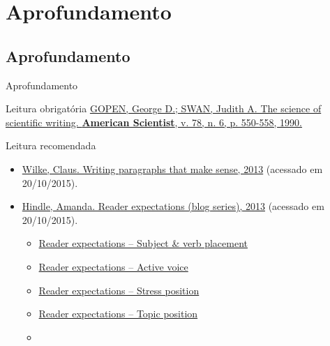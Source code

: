 \documentclass{beamer}
\begin{document}
\section{Aprofundamento}

\subsection{Aprofundamento}

\begin{frame}{Aprofundamento}
  \begin{block}{Leitura obrigatória}
    \footnotesize
    \href{https://www.georgegopen.com/uploads/1/0/9/0/109073507/gopen___swan_sci_of_sci_writing_am_sci_1990_.pdf}
    {GOPEN, George D.; SWAN, Judith A. The science of scientific writing. {\bf American Scientist}, v. 78, n. 6, p. 550-558, 1990.}
  \end{block}
  \begin{block}{Leitura recomendada}
    \begin{itemize}
      \tiny
    \item
      \href{http://serialmentor.com/blog/2013/9/26/writing-paragraphs-that-make-sensethe-topic-and-the-stress-position}
      {Wilke, Claus. Writing paragraphs that make sense, 2013} {\tiny (acessado em 20/10/2015)}.
    \item
      \href{https://web.archive.org/web/20150512085221/http://www.edanzediting.com/blog/tag/reader_expectations}
      {Hindle, Amanda. Reader expectations (blog series), 2013} {\tiny (acessado em 20/10/2015)}.
      \begin{itemize}
        \tiny
      \item
        \href{https://web.archive.org/web/20150512001938/http://www.edanzediting.com/blog/reader_expectations_subject_verb_placement}
        {Reader expectations -- Subject \& verb placement}
      \item
        \href{https://web.archive.org/web/20150321052033/http://www.edanzediting.com/blog/reader_expectations_active_voice}
        {Reader expectations -- Active voice}
      \item
        \href{https://web.archive.org/web/20150511225632/http://www.edanzediting.com/blog/reader_expectations_stress_position}
        {Reader expectations -- Stress position}
      \item
        \href{https://web.archive.org/web/20150512123007/http://www.edanzediting.com/blog/reader_expectations_topic_position}
        {Reader expectations -- Topic position}
      \item

\end{itemize}
\end{itemize}
\end{block}
\end{frame}
\end{document}

